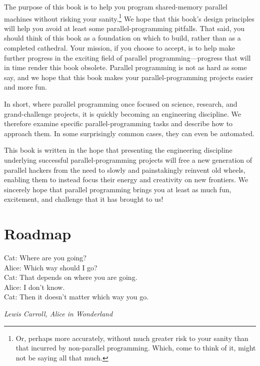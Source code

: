
%

The purpose of this book is to help you program
shared-memory parallel machines without risking your sanity.\footnote{
	Or, perhaps more accurately, without much greater risk to your
	sanity than that incurred by non-parallel programming.
	Which, come to think of it, might not be saying all that much.}
We hope that this book's design principles will help you avoid at least some
parallel-programming pitfalls.
That said, you should think of this book as a foundation on which to build,
rather than as a completed cathedral.
Your mission, if you choose to accept, is to help make further progress
in the exciting field of parallel programming---progress that will
in time render this book obsolete.
Parallel programming is not as hard as some say, and we hope
that this book makes your parallel-programming projects easier and
more fun.

In short, where parallel programming once focused on science, research,
and grand-challenge projects, it is quickly becoming an engineering
discipline.
We therefore examine specific parallel-programming tasks
and describe how to approach them.
In some surprisingly common cases, they can even be automated.

This book is written in the hope that presenting the engineering
discipline underlying successful
parallel-programming projects will free a new generation of parallel hackers
from the need to slowly and painstakingly reinvent old wheels, enabling
them to instead focus their energy and creativity on new frontiers.
We sincerely hope that parallel programming brings you at least as
much fun, excitement, and challenge that it has brought to us!

\section{Roadmap}
\label{sec:howto:Roadmap}
%
\epigraph{Cat: Where are you going? \\
	  Alice: Which way should I go? \\
	  Cat: That depends on where you are going. \\
	  Alice: I don't know. \\
	  Cat: Then it doesn't matter which way you go.}
	 {\emph{Lewis Carroll, Alice in Wonderland}}

